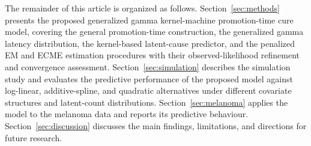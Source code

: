 The remainder of this article is organized as follows. Section~\ref{sec:methods}
presents the proposed generalized gamma kernel-machine promotion-time cure
model, covering the general promotion-time construction, the generalized gamma
latency distribution, the kernel-based latent-cause predictor, and the penalized
EM and ECME estimation procedures with their observed-likelihood refinement and
convergence assessment. Section~\ref{sec:simulation} describes the simulation
study and evaluates the predictive performance of the proposed model against
log-linear, additive-spline, and quadratic alternatives under different
covariate structures and latent-count distributions. Section~\ref{sec:melanoma}
applies the model to the melanoma data and reports its predictive behaviour.
Section~\ref{sec:discussion} discusses the main findings, limitations, and
directions for future research.
